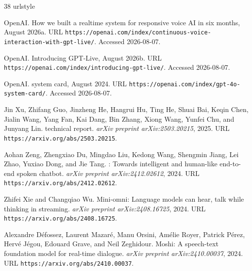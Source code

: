 \documentclass[UTF8,fontset=none,a4paper,10pt]{ctexart}
\begin{document}
{\footnotesize
\begin{thebibliography}{38}
\providecommand{\natexlab}[1]{#1}
\providecommand{\url}[1]{\texttt{#1}}
\expandafter\ifx\csname urlstyle\endcsname\relax
  \providecommand{\doi}[1]{doi: #1}\else
  \providecommand{\doi}{doi: \begingroup \urlstyle{rm}\Url}\fi

\bibitem[{OpenAI}(2026{\natexlab{a}})]{openai2026continuous}
{OpenAI}.
\newblock How we built a realtime system for responsive voice {AI} in six
  months, August 2026{\natexlab{a}}.
\newblock URL
  \url{https://openai.com/index/continuous-voice-interaction-with-gpt-live/}.
\newblock Accessed 2026-08-07.

\bibitem[{OpenAI}(2026{\natexlab{b}})]{openai2026gptlive}
{OpenAI}.
\newblock Introducing {GPT-Live}, August 2026{\natexlab{b}}.
\newblock URL \url{https://openai.com/index/introducing-gpt-live/}.
\newblock Accessed 2026-08-07.

{OpenAI}.
 system card, August 2024.
\newblock URL \url{https://openai.com/index/gpt-4o-system-card/}.
\newblock Accessed 2026-08-07.

Jin Xu, Zhifang Guo, Jinzheng He, Hangrui Hu, Ting He, Shuai Bai, Keqin Chen,
  Jialin Wang, Yang Fan, Kai Dang, Bin Zhang, Xiong Wang, Yunfei Chu, and
  Junyang Lin.
 technical report.
\newblock \emph{arXiv preprint arXiv:2503.20215}, 2025.
\newblock URL \url{https://arxiv.org/abs/2503.20215}.

Aohan Zeng, Zhengxiao Du, Mingdao Liu, Kedong Wang, Shengmin Jiang, Lei Zhao,
  Yuxiao Dong, and Jie Tang.
: Towards intelligent and human-like end-to-end spoken
  chatbot.
\newblock \emph{arXiv preprint arXiv:2412.02612}, 2024.
\newblock URL \url{https://arxiv.org/abs/2412.02612}.

Zhifei Xie and Changqiao Wu.
\newblock Mini-omni: Language models can hear, talk while thinking in
  streaming.
\newblock \emph{arXiv preprint arXiv:2408.16725}, 2024.
\newblock URL \url{https://arxiv.org/abs/2408.16725}.

Alexandre D{\'e}fossez, Laurent Mazar{\'e}, Manu Orsini, Am{\'e}lie Royer,
  Patrick P{\'e}rez, Herv{\'e} J{\'e}gou, Edouard Grave, and Neil Zeghidour.
\newblock Moshi: A speech-text foundation model for real-time dialogue.
\newblock \emph{arXiv preprint arXiv:2410.00037}, 2024.
\newblock URL \url{https://arxiv.org/abs/2410.00037}.


\end{thebibliography}}
\end{document}
